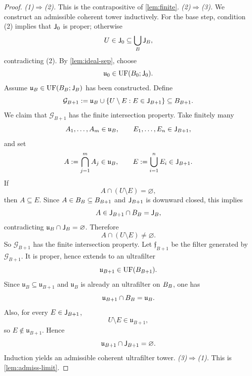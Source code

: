 \begin{proof}
	\emph{(1)\(\Rightarrow\)(2).}
	This is the contrapositive of \cref{lem:finite}.
	\smallskip
	\emph{(2)\(\Rightarrow\)(3).}
	We construct an admissible coherent tower inductively.
	For the base step, condition \textup{(2)} implies that \(\mathsf J_0\) is
	proper; otherwise
	\[
		U\in\mathsf J_0\subseteq\bigcup_B\mathsf J_B,
	\]
	contradicting \textup{(2)}. By \cref{lem:ideal-sep}, choose
	\[
		\mathfrak u_0\in\operatorname{UF}(B_0;\mathsf J_0).
	\]
	Assume \(\mathfrak u_B\in\operatorname{UF}(B_B;\mathsf J_B)\) has been constructed. Define
	\[
		\mathcal G_{B+1}
		:=
		\mathfrak u_B\cup\{U\setminus E:E\in\mathsf J_{B+1}\}
		\subseteq B_{B+1}.
	\]
	We claim that \(\mathcal G_{B+1}\) has the finite intersection property.
	Take finitely many
	\[
		A_1,\dots,A_m\in\mathfrak u_B,
		\qquad
		E_1,\dots,E_n\in\mathsf J_{B+1},
	\]
	and set
	\[
		A:=\bigcap_{j=1}^m A_j\in\mathfrak u_B,
		\qquad
		E:=\bigcup_{i=1}^n E_i\in\mathsf J_{B+1}.
	\]
	If
	\[
		A\cap(U\setminus E)=\varnothing,
	\]
	then \(A\subseteq E\). Since \(A\in B_B\subseteq B_{B+1}\) and
	\(\mathsf J_{B+1}\) is downward closed, this implies
	\[
		A\in\mathsf J_{B+1}\cap B_B=\mathsf J_B,
	\]
	contradicting \(\mathfrak u_B\cap\mathsf J_B=\varnothing\). Therefore
	\[
		A\cap(U\setminus E)\neq\varnothing.
	\]
	So \(\mathcal G_{B+1}\) has the finite intersection property.
	Let \(\mathfrak f_{B+1}\) be the filter generated by
	\(\mathcal G_{B+1}\). It is proper, hence extends to an ultrafilter
	\[
		\mathfrak u_{B+1}\in\operatorname{UF}(B_{B+1}).
	\]
	Since \(\mathfrak u_B\subseteq\mathfrak u_{B+1}\) and
	\(\mathfrak u_B\) is already an ultrafilter on \(B_B\), one has
	\[
		\mathfrak u_{B+1}\cap B_B=\mathfrak u_B.
	\]
	Also, for every \(E\in\mathsf J_{B+1}\),
	\[
		U\setminus E\in\mathfrak u_{B+1},
	\]
	so \(E\notin\mathfrak u_{B+1}\). Hence
	\[
		\mathfrak u_{B+1}\cap\mathsf J_{B+1}=\varnothing.
	\]
	Induction yields an admissible coherent ultrafilter tower.
	\smallskip
	\emph{(3)\(\Rightarrow\)(1).}
	This is \cref{lem:admiss-limit}.
\end{proof}
